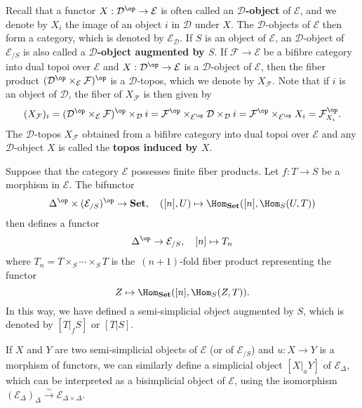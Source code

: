 Recall that a functor $X:\mathcal{D}^{\op}\to \mathcal{E}$ is often called an \textbf{$\mathcal{D}$-object} of $\mathcal{E}$, and we denote by $X_i$ the image of an object $i$ in $\mathcal{D}$ under $X$. The $\mathcal{D}$-objects of $\mathcal{E}$ then form a category, which is denoted by $\mathcal{E}_\mathcal{D}$. If $S$ is an object of $\mathcal{E}$, an $\mathcal{D}$-object of $\mathcal{E}_{/S}$ is also called a \textbf{$\mathcal{D}$-object augmented by $S$}. If $\mathcal{F}\to \mathcal{E}$ be a bifibre category into dual topoi over $\mathcal{E}$ and $X:\mathcal{D}^{\op}\to \mathcal{E}$ is a $\mathcal{D}$-object of $\mathcal{E}$, then the fiber product $(\mathcal{D}^{\op}\times_\mathcal{E}\mathcal{F})^{\op}$ is a $\mathcal{D}$-topos, which we denote by $X_\mathcal{F}$. Note that if $i$ is an object of $\mathcal{D}$, the fiber of $X_\mathcal{F}$ is then given by
\begin{equation}\label{topos fibre given by D-object-1}
(X_\mathcal{F})_i=(\mathcal{D}^{\op}\times_\mathcal{E}\mathcal{F})^{\op}\times_\mathcal{D}i=\mathcal{F}^{\op}\times_{\mathcal{E}^{\op}}\mathcal{D}\times_\mathcal{D}i=\mathcal{F}^{\op}\times_{\mathcal{E}^{\op}}X_i=\mathcal{F}_{X_i}^{\op}.
\end{equation}
The $\mathcal{D}$-topos $X_\mathcal{F}$ obtained from a bifibre category into dual topoi over $\mathcal{E}$ and any $\mathcal{D}$-object $X$ is called the \textbf{topos induced by $X$}.

\begin{example}\label{topos fibre D-object given by fiber product}
Suppose that the category $\mathcal{E}$ possesses finite fiber products. Let $f:T\to S$ be a morphism in $\mathcal{E}$. The bifunctor
\[\Delta^{\op}\times(\mathcal{E}_{/S})^{\op}\to \mathbf{Set}, \quad ([n],U)\mapsto\Hom_{\mathbf{Set}}([n],\Hom_S(U,T))\]
then defines a functor
\[\Delta^{\op}\to \mathcal{E}_{/S},\quad [n]\mapsto T_n\]
where $T_n=T\times_S\cdots\times_ST$ is the~$(n+1)$-fold fiber product representing the functor
\[Z\mapsto\Hom_{\mathbf{Set}}([n],\Hom_S(Z,T)).\]
In this way, we have defined a semi-simplicial object augmented by $S$, which is denoted by $[T|_fS]$ or $[T|S]$.\par
If $X$ and $Y$ are two semi-simplicial objects of $\mathcal{E}$ (or of $\mathcal{E}_{/S}$) and $u:X\to Y$ is a morphism of functors, we can similarly define a simplicial object $[X|_uY]$ of $\mathcal{E}_{\Delta}$, which can be interpreted as a bisimplicial object of $\mathcal{E}$, using the isomorphism $(\mathcal{E}_{\Delta})_\Delta\stackrel{\sim}{\to }\mathcal{E}_{\Delta\times\Delta}$.
\end{example}

